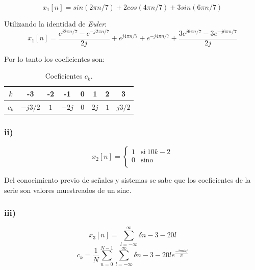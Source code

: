 \documentclass{article}
\begin{document}
\begin{equation}
    x_1[n]= sin(2\pi n/7) + 2cos(4 \pi n /7) + 3sin(6\pi n/7)
\end{equation}


Utilizando la identidad de \textit{Euler}:
\begin{equation}
    x_1[n]= \frac{e^{j2\pi n/7} - e^{-j2\pi n/7} }{2j} +  e^{j4\pi n/7} + e^{-j4\pi n/7} + \frac{3e^{j6\pi n/7} - 3e^{-j6\pi n/7} }{2j}
\end{equation}

Por lo tanto los coeficientes son:
\begin{table}[H]
    \centering
    \begin{tabular}{|c|c|c|c|c|c|c|c|}
        \hline
        $k$ & -3 & -2 & -1 & 0 & 1 & 2 & 3  \\ \hline
        $c_k$ & $-j3/2$ & $1$ & $-2j$ & 0 & $2j$ & $1$ & $j3/2$ \\ \hline
        \end{tabular}
    \caption{Coeficientes $c_k$.}
    \label{}
\end{table}

\subsubsection*{ii)}
\begin{equation} 
    x_{2}[n] = \left\{ 
    \begin{array}{ll} 
    1 & \mathrm{si\ } 10 k - 2\\
    0 & \mathrm{sino\ } \\
    \end{array} 
    \right.
\end{equation}
 
Del conocimiento previo de señales y sistemas se sabe que los coeficientes de la serie son valores muestreados de un sinc.

\subsubsection*{iii)}

\begin{equation} 
    x_{3}[n]=\sum_{l=-\infty}^{\infty}\delta{n-3-20 l} 
\end{equation}
\begin{equation} 
    c_{k}=\frac{1}{N} \sum_{n=0}^{N-1}\sum_{l=-\infty}^{\infty} \delta{n-3-20 l}  e^{\frac{-2 \pi n k j }{N}}
\end{equation}
\end{document}
